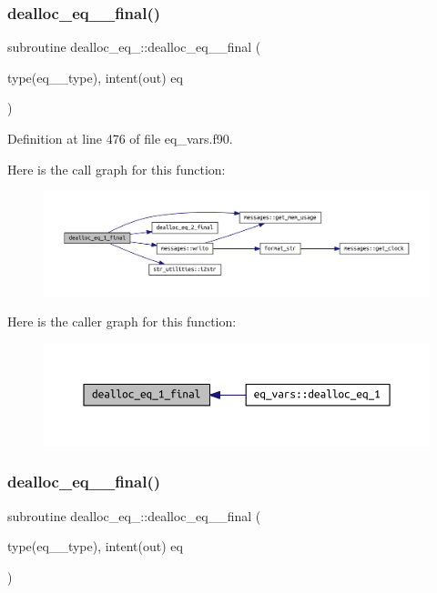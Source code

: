 \subsubsection{\texorpdfstring{dealloc\+\_\+eq\+\_\+\_\+final()}{dealloc\_eq\_1\_final()}}
{\footnotesize\ttfamily subroutine dealloc\+\_\+eq\+\_\+::dealloc\+\_\+eq\+\_\+\_\+final (\begin{DoxyParamCaption}\item[{type(eq\+\_\+1\+\_\+type), intent(out)}]{eq }\end{DoxyParamCaption})}



Definition at line 476 of file eq\+\_\+vars.\+f90.

Here is the call graph for this function\+:
\nopagebreak
\begin{figure}[H]
\begin{center}
\leavevmode
\includegraphics[width=350pt]{eq__vars_8f90_aeb2dafd97b9ec2443da5f6de043d56ff_cgraph}
\end{center}
\end{figure}
Here is the caller graph for this function\+:
\nopagebreak
\begin{figure}[H]
\begin{center}
\leavevmode
\includegraphics[width=350pt]{eq__vars_8f90_aeb2dafd97b9ec2443da5f6de043d56ff_icgraph}
\end{center}
\end{figure}
\mbox{\label{eq__vars_8f90_a0485e4116f0b0004f9a06ed86ac624aa}} 
\subsubsection{\texorpdfstring{dealloc\+\_\+eq\+\_\+\_\+final()}{dealloc\_eq\_2\_final()}}
{\footnotesize\ttfamily subroutine dealloc\+\_\+eq\+\_\+::dealloc\+\_\+eq\+\_\+\_\+final (\begin{DoxyParamCaption}\item[{type(eq\+\_\+2\+\_\+type), intent(out)}]{eq }\end{DoxyParamCaption})}



